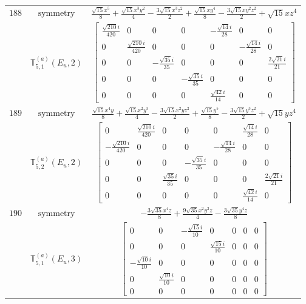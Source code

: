 \documentclass[fleqn,8pt,landscape]{jsarticle}
\begin{document}
\begin{longtable}{ccc}
$ 188 $ & $ \text{symmetry} $ & $ \frac{\sqrt{15} x^{5}}{8} + \frac{\sqrt{15} x^{3} y^{2}}{4} - \frac{3 \sqrt{15} x^{3} z^{2}}{2} + \frac{\sqrt{15} x y^{4}}{8} - \frac{3 \sqrt{15} x y^{2} z^{2}}{2} + \sqrt{15} x z^{4} $ \\
$  $ & $ \mathbb{T}_{5,1}^{(a)}(E_{u},2) $ & $ \begin{bmatrix} \frac{\sqrt{210} i}{420} & 0 & 0 & 0 & - \frac{\sqrt{14} i}{28} & 0 & 0 \\ 0 & \frac{\sqrt{210} i}{420} & 0 & 0 & 0 & - \frac{\sqrt{14} i}{28} & 0 \\ 0 & 0 & - \frac{\sqrt{35} i}{35} & 0 & 0 & 0 & \frac{2 \sqrt{21} i}{21} \\ 0 & 0 & 0 & - \frac{\sqrt{35} i}{35} & 0 & 0 & 0 \\ 0 & 0 & 0 & 0 & \frac{\sqrt{42} i}{14} & 0 & 0 \end{bmatrix} $ \\ \hline
$ 189 $ & $ \text{symmetry} $ & $ \frac{\sqrt{15} x^{4} y}{8} + \frac{\sqrt{15} x^{2} y^{3}}{4} - \frac{3 \sqrt{15} x^{2} y z^{2}}{2} + \frac{\sqrt{15} y^{5}}{8} - \frac{3 \sqrt{15} y^{3} z^{2}}{2} + \sqrt{15} y z^{4} $ \\
$  $ & $ \mathbb{T}_{5,2}^{(a)}(E_{u},2) $ & $ \begin{bmatrix} 0 & \frac{\sqrt{210} i}{420} & 0 & 0 & 0 & \frac{\sqrt{14} i}{28} & 0 \\ - \frac{\sqrt{210} i}{420} & 0 & 0 & 0 & - \frac{\sqrt{14} i}{28} & 0 & 0 \\ 0 & 0 & 0 & - \frac{\sqrt{35} i}{35} & 0 & 0 & 0 \\ 0 & 0 & \frac{\sqrt{35} i}{35} & 0 & 0 & 0 & \frac{2 \sqrt{21} i}{21} \\ 0 & 0 & 0 & 0 & 0 & \frac{\sqrt{42} i}{14} & 0 \end{bmatrix} $ \\ \hline
$ 190 $ & $ \text{symmetry} $ & $ - \frac{3 \sqrt{35} x^{4} z}{8} + \frac{9 \sqrt{35} x^{2} y^{2} z}{4} - \frac{3 \sqrt{35} y^{4} z}{8} $ \\
$  $ & $ \mathbb{T}_{5,1}^{(a)}(E_{u},3) $ & $ \begin{bmatrix} 0 & 0 & - \frac{\sqrt{15} i}{10} & 0 & 0 & 0 & 0 \\ 0 & 0 & 0 & \frac{\sqrt{15} i}{10} & 0 & 0 & 0 \\ - \frac{\sqrt{10} i}{10} & 0 & 0 & 0 & 0 & 0 & 0 \\ 0 & \frac{\sqrt{10} i}{10} & 0 & 0 & 0 & 0 & 0 \\ 0 & 0 & 0 & 0 & 0 & 0 & 0 \end{bmatrix} $ \\ \hline

\end{longtable}
\end{document}
